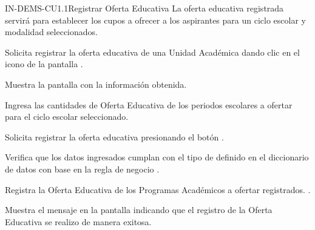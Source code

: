 \begin{UseCase}{IN-DEMS-CU1.1}{Registrar Oferta Educativa}{
	La oferta educativa registrada servirá para establecer los cupos a ofrecer a los aspirantes para un ciclo escolar y modalidad seleccionados.\\
}
{\begin{Titemize}
			\Titem {}
						
			\Titem {}
			
		\end{Titemize} 
	}
	
\end{UseCase}

\begin{UCtrayectoria}

	\UCpaso [\UCactor] Solicita registrar la oferta educativa de una Unidad Académica dando clic en el icono \IUArchivo de la pantalla .

	\UCpaso Muestra la pantalla  con la información obtenida.

	\UCpaso [\UCactor] Ingresa las cantidades de Oferta Educativa de los periodos escolares a ofertar para el ciclo escolar seleccionado.

	\UCpaso [\UCactor] \label{IN-DEMS-CU1.1:Registrar} Solicita registrar la oferta educativa presionando el botón . 

	\UCpaso Verifica que los datos ingresados cumplan con el tipo de definido en el diccionario de datos con base en la regla de negocio . 

	\UCpaso Registra la Oferta Educativa de los Programas Académicos a ofertar registrados. .

	\UCpaso Muestra el mensaje  en la pantalla  indicando que el registro de la Oferta Educativa se realizo de manera exitosa.
\end{UCtrayectoria}

